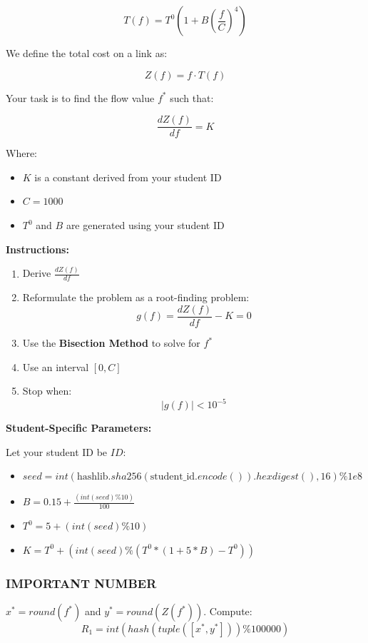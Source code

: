 \documentclass{rapportCS} %
\begin{document}
$$ T(f) = T^0 \left(1 + B \left(\frac{f}{C}\right)^4 \right) $$

We define the total cost on a link as:

$$ Z(f) = f \cdot T(f) $$

Your task is to find the flow value \( f^* \) such that:

$$ \frac{dZ(f)}{df} = K $$

Where:
\begin{itemize}
    \item \( K \) is a constant derived from your student ID
    \item \( C = 1000 \)
    \item \( T^0 \) and \( B \) are generated using your student ID
\end{itemize}

\textbf{Instructions:}
\begin{enumerate}
    \item Derive \( \frac{dZ(f)}{df} \)
    \item Reformulate the problem as a root-finding problem:
    $$ g(f) = \frac{dZ(f)}{df} - K = 0 $$
    \item Use the \textbf{Bisection Method} to solve for \( f^* \)
    \item Use an interval \( [0, C] \)
    \item Stop when:
    $$ |g(f)| < 10^{-5} $$
\end{enumerate}

\textbf{Student-Specific Parameters:}

Let your student ID be \( ID \):
\begin{itemize}
    \item \( seed = int(\text{hashlib}.sha256(\text{student\_id}.encode()).hexdigest(), 16) \% 1e8 \)
    \item \( B = 0.15 + \frac{(int(seed) \% 10)}{100} \)
    \item \( T^0 = 5 + (int(seed) \% 10) \)
    \item \( K = T^0 + (int(seed) \% (T^0*(1+5*B) - T^0)) \)
\end{itemize}

\subsubsection*{IMPORTANT NUMBER}

\(x^* = round(f^*)\) and \(y^* = round(Z(f^*))\). Compute:
$$ R_1 = int(hash(tuple([x^*, y^*])) \% 100000) $$

\end{document}
